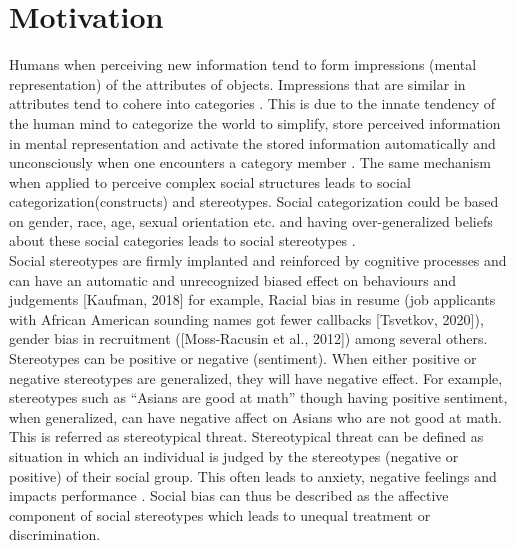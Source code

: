 \chapter{Motivation}
\label{ch:Motivation}

Humans when perceiving new information tend to form impressions (mental representation) of the attributes of objects. Impressions that are similar in attributes tend to cohere into categories \cite{fiske1998stereotyping}\cite{allport1954nature}. This is due to the innate tendency of the human mind to categorize the world to simplify, store perceived information in mental representation and activate the stored information automatically and unconsciously when one encounters
a category member \cite{ComputationalEthics}. The same mechanism when applied to perceive complex social structures leads to social categorization(constructs) and stereotypes. Social categorization could be based on gender, race, age, sexual orientation etc. and having over-generalized beliefs about these social categories leads to social stereotypes \cite{beukeboom2019stereotypes}\cite{ComputationalEthics}.	
\\

Social stereotypes are firmly implanted and reinforced by cognitive processes and can have
an automatic and unrecognized biased effect on behaviours and judgements [Kaufman, 2018]
for example, Racial bias in resume (job applicants with African American sounding names
got fewer callbacks [Tsvetkov, 2020]), gender bias in recruitment ([Moss-Racusin et al., 2012])
among several others. Stereotypes can be positive or negative (sentiment). When either positive or negative stereotypes are generalized, they will have negative effect. For example, stereotypes such as “Asians are good at math” though having positive sentiment, when generalized, can have negative affect on Asians who are not good at math. This is referred as stereotypical threat. Stereotypical threat can be defined as situation in which an individual is judged by the stereotypes (negative or positive) of their social group. This often leads to anxiety, negative feelings and impacts performance \cite{beukeboom2019stereotypes}\cite{spencer2016stereotype}. Social
bias can thus be described as the affective component of social stereotypes which leads to unequal treatment or
discrimination.
\\

